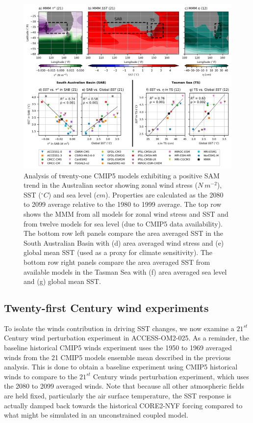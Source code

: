 \documentclass[draft,linenumbers]{agujournal2018}
\begin{document}
\begin{figure}[h]
\centering
\includegraphics[trim={0 0 0 0},clip, width=1\textwidth]{p26_fig2_.png}
\caption{Analysis of twenty-one CMIP5 models exhibiting a positive SAM trend in the Australian sector showing zonal wind stress ($N\ m^{-2}$), SST ($^{\circ}C$) and sea level ($cm$). Properties are calculated as the 2080 to 2099 average relative to the 1980 to 1999 average. The top row shows the MMM from all models for zonal wind stress and SST and from twelve models for sea level (due to CMIP5 data availability). The bottom row left panels compare the area averaged SST in the South Australian Basin with (d) area averaged wind stress and (e) global mean SST (used as a proxy for climate sensitivity). The bottom row right panels compare the area averaged SST from available models in the Tasman Sea with (f) area averaged sea level and (g) global mean SST.}\label{p26_fig1_}
\end{figure}


\subsection{Twenty-first Century wind experiments} \label{Twenty-first Century winds experiment}
To isolate the winds contribution in driving SST changes, we now examine a $21^{st}$ Century wind perturbation experiment in ACCESS-OM2-025. As a reminder, the baseline historical CMIP5 winds experiment uses the 1950 to 1969 averaged winds from the 21 CMIP5 models ensemble mean described in the previous analysis. This is done to obtain a baseline experiment using CMIP5 historical winds to compare to the $21^{st}$ Century winds perturbation experiment, which uses the 2080 to 2099 averaged winds. Note that because all other atmospheric fields are held fixed, particularly the air surface temperature, the SST response is actually damped back towards the historical CORE2-NYF forcing compared to what might be simulated in an unconstrained coupled model.
\end{document}
